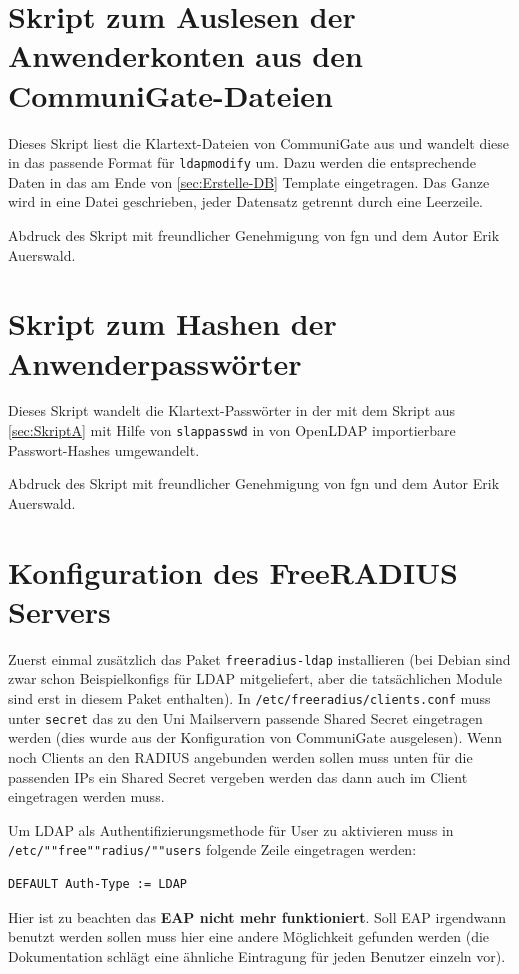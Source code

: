 \documentclass[11pt,a4paper,titlepage=firstiscover,headsepline,bibtotoc]{scrartcl} %
\begin{document}
\newpage
\section{Skript zum Auslesen der Anwenderkonten aus den CommuniGate-Dateien}\label{sec:SkriptA}

Dieses Skript liest die Klartext-Dateien von CommuniGate aus und wandelt diese in das passende Format für \texttt{ldapmodify} um. Dazu werden die entsprechende Daten in das am Ende von \autoref{sec:Erstelle-DB} Template eingetragen. Das Ganze wird in eine Datei geschrieben, jeder Datensatz getrennt durch eine Leerzeile.

Abdruck des Skript mit freundlicher Genehmigung von fgn und dem Autor Erik Auerswald.

\newpage
\section{Skript zum Hashen der Anwenderpasswörter}\label{sec:SkriptB}

Dieses Skript wandelt die Klartext-Passwörter in der mit dem Skript aus \autoref{sec:SkriptA} mit Hilfe von \texttt{slappasswd} in von OpenLDAP importierbare Passwort-Hashes umgewandelt.

Abdruck des Skript mit freundlicher Genehmigung von fgn und dem Autor Erik Auerswald.

\newpage
\section{Konfiguration des FreeRADIUS Servers}\label{sec:RADIUS-Konfig}
Zuerst einmal zusätzlich das Paket \texttt{freeradius-ldap} installieren (bei Debian sind zwar schon Beispielkonfigs für LDAP mitgeliefert, aber die tatsächlichen Module sind erst in diesem Paket enthalten). In \texttt{/etc/freeradius/clients.conf} muss unter \texttt{secret} das zu den Uni Mailservern passende Shared Secret eingetragen werden (dies wurde aus der Konfiguration von CommuniGate ausgelesen). Wenn noch Clients an den RADIUS angebunden werden sollen muss unten für die passenden IPs ein Shared Secret vergeben werden das dann auch im Client eingetragen werden muss.

Um LDAP als Authentifizierungsmethode für User zu aktivieren muss in \texttt{/etc/""free""radius/""users} folgende Zeile eingetragen werden:
\begin{lstlisting}
DEFAULT Auth-Type := LDAP
\end{lstlisting}
Hier ist zu beachten das \textbf{EAP nicht mehr funktioniert}. Soll EAP irgendwann benutzt werden sollen muss hier eine andere Möglichkeit gefunden werden (die Dokumentation schlägt eine ähnliche Eintragung für jeden Benutzer einzeln vor).
\end{document}
